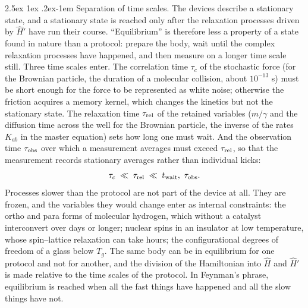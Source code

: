 \documentclass[10pt,a4paper]{article}
\makeatletter
\renewcommand{\paragraph}{\@startsection{paragraph}{4}{\z@}%
  {2.5ex \@plus 1ex \@minus .2ex}{-1em}%
  {\normalfont\fontsize{14pt}{17pt}\selectfont\bfseries}}
\makeatother
\begin{document}
\paragraph{Separation of time scales.}
The devices describe a stationary state, and a stationary state is reached only after the relaxation processes driven by $ \hat H' $ have run their course.
``Equilibrium'' is therefore less a property of a state found in nature than a protocol: prepare the body, wait until the complex relaxation processes have happened, and then measure on a longer time scale still.
Three time scales enter.
The correlation time $ \tau_c $ of the stochastic force (for the Brownian particle, the duration of a molecular collision, about $ 10^{-13} $ s) must be short enough for the force to be represented as white noise; otherwise the friction acquires a memory kernel, which changes the kinetics but not the stationary state.
The relaxation time $ \tau_{\rm rel} $ of the retained variables ($ m/\gamma $ and the diffusion time across the well for the Brownian particle, the inverse of the rates $ K_{ab} $ in the master equation) sets how long one must wait.
And the observation time $ \tau_{\rm obs} $ over which a measurement averages must exceed $ \tau_{\rm rel} $, so that the measurement records stationary averages rather than individual kicks:
\[
  \tau_c \;\ll\; \tau_{\rm rel} \;\ll\; t_{\rm wait},\ \tau_{\rm obs} .
\]
Processes slower than the protocol are not part of the device at all.
They are frozen, and the variables they would change enter as internal constraints: the ortho and para forms of molecular hydrogen, which without a catalyst interconvert over days or longer; nuclear spins in an insulator at low temperature, whose spin--lattice relaxation can take hours; the configurational degrees of freedom of a glass below $ T_g $.
The same body can be in equilibrium for one protocol and not for another, and the division of the Hamiltonian into $ \hat H $ and $ \hat H' $ is made relative to the time scales of the protocol.
In Feynman's phrase, equilibrium is reached when all the fast things have happened and all the slow things have not.
\end{document}
